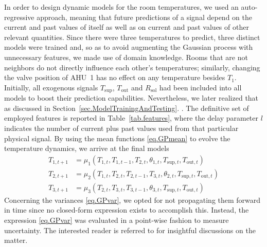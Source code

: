 In order to design dynamic models for the room temperatures, we used an auto-regressive approach, meaning that future predictions of a signal depend on the current and past values of itself as well as on current and past values of other relevant quantities. Since there were three temperatures to predict, three distinct models were trained and, so as to avoid augmenting the Gaussian process with unnecessary features, we made use of domain knowledge. Rooms that are not neighbors do not directly influence each other's temperatures; similarly, changing the valve position of AHU~1 has no effect on any temperature besides $T_1$. Initially, all exogenous signals $T_\text{sup}$, $T_\text{out}$ and $R_\text{sol}$ had been included into all models to boost their prediction capabilities. Nevertheless, we later realized that  as discussed in Section~\ref{sec.ModelTrainingAndTesting}. . The definitive set of employed features is reported in Table~\ref{tab.features}, where the delay parameter $l$ indicates the number of current plus past values used from that particular physical signal. By using the mean functions \eqref{eq.GPmean} to evolve the temperature dynamics, we arrive at the final models
\begin{subequations}
	\begin{align}
		T_{1,t+1} &= \mu_{1}(T_{1,t}, T_{1,t-1}, T_{2,t}, \theta_{1,t},T_{\text{sup},t},T_{\text{out},t}) \\
		T_{2,t+1} &= \mu_{2}(T_{1,t}, T_{2,t}, T_{2,t-1}, T_{3,t}, \theta_{2,t},T_{\text{sup},t},T_{\text{out},t}) \\
		T_{3,t+1} &= \mu_{3}(T_{2,t}, T_{3,t}, T_{3,t-1}, \theta_{3,t},T_{\text{sup},t},T_{\text{out},t}) 
	\end{align}
	\label{eq.GPmodels}
\end{subequations}
Concerning the variances \eqref{eq.GPvar}, we opted for not propagating them forward in time since no closed-form expression exists to accomplish this. Instead, the expression \eqref{eq.GPvar} was evaluated in a point-wise fashion to measure uncertainty. The interested reader is referred to \cite{girard2004approximate,mchutchon2011gaussian} for insightful discussions on the matter.

